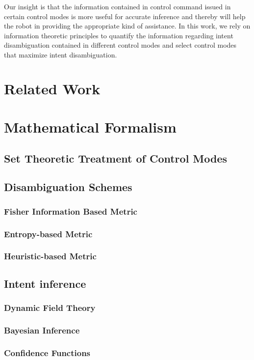 \documentclass[conference]{IEEEtran}
\begin{document}
Our insight is that the information contained in control command issued in certain control modes is more useful for accurate inference and thereby will help the robot in providing the appropriate kind of assistance. In this work, we rely on information theoretic principles to quantify the information regarding intent disambiguation contained in different control modes and select control modes that maximize intent disambiguation.

\section{Related Work}

\section{Mathematical Formalism}
\subsection{Set Theoretic Treatment of Control Modes}
\subsection{Disambiguation Schemes}
\subsubsection{Fisher Information Based Metric}
\subsubsection{Entropy-based Metric}
\subsubsection{Heuristic-based Metric}

\subsection{Intent inference}
\subsubsection{Dynamic Field Theory}
\subsubsection{Bayesian Inference}
\subsubsection{Confidence Functions}
\end{document}
